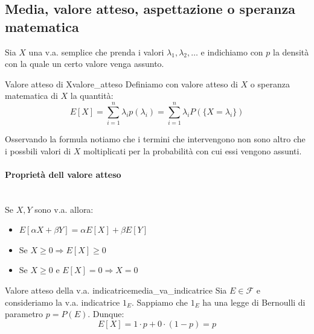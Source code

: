 \documentclass[12pt]{report}
\newcounter{definition}
\newcommand{\nmu}{}
\begin{document}
 	\subsection{Media, valore atteso, aspettazione o speranza matematica}
 	Sia $X$ una v.a. semplice che prenda i valori $\lambda_1, \lambda_2, \dots$ e indichiamo con $p$ la densità con la quale un certo valore venga assunto.
 	\begin{definition}{\nmu Valore atteso di X}{valore_atteso}
 		Definiamo con valore atteso di $X$ o speranza matematica di $X$ la quantità:
 		\[
 		E[X] = \sum_{i=1}^{n}\lambda_ip(\lambda_i) = \sum_{i=1}^{n}\lambda_iP(\{X = \lambda_i\})
 		\]
 	\end{definition}
 	Osservando la formula notiamo che i termini che intervengono non sono altro che i possbili valori di $X$ moltiplicati per la probabilità con cui essi vengono assunti.
 	\paragraph{Proprietà dell valore atteso} \quad \\
 	Se $X, Y$ sono v.a. allora:
 	\begin{itemize}
 		\item $E[\alpha X + \beta Y] = \alpha E[X] + \beta E[Y]$
 		\item Se $X \geq 0 \Rightarrow E[X] \geq 0$
 		\item Se $X \geq 0$ e $E[X] = 0 \Rightarrow X = 0$
 	\end{itemize}
	\begin{example}{\nmu Valore atteso della v.a. indicatrice}{media_va_indicatrice}
 		Sia $E \in \mathcal{F}$ e consideriamo la v.a. indicatrice $1_E$. Sappiamo che $1_E$ ha una legge di Bernoulli di parametro $p = P(E)$. Dunque:
 		\[
 		E[X] = 1 \cdot p + 0 \cdot (1 - p) = p
 		\]
 	\end{example}
\end{document}
